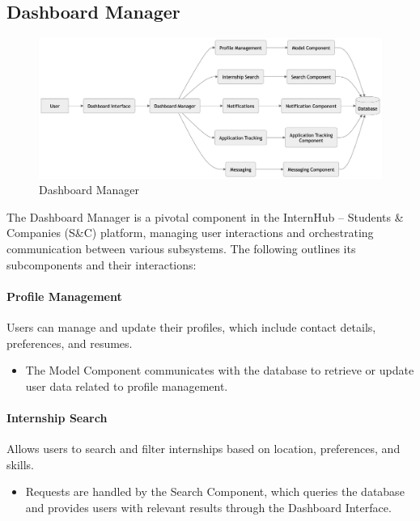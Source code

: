 \subsection{Dashboard Manager}
\label{subsubsec:dashboard_manager}

\begin{figure}[H]
    \begin{center}
        \includegraphics[width=0.82\linewidth]{JhaBhatiaSharma/imagesDD/DashboardManager.png}
        \caption{Dashboard Manager}
        \label{fig:dashboardmanager}%
    \end{center}
\end{figure}

The Dashboard Manager is a pivotal component in the InternHub – Students \& Companies (S\&C) platform, managing user interactions and orchestrating communication between various subsystems. The following outlines its subcomponents and their interactions:

\paragraph{Profile Management}
Users can manage and update their profiles, which include contact details, preferences, and resumes.
\begin{itemize}
    \item The Model Component communicates with the database to retrieve or update user data related to profile management.
\end{itemize}

\paragraph{Internship Search}
Allows users to search and filter internships based on location, preferences, and skills.
\begin{itemize}
    \item Requests are handled by the Search Component, which queries the database and provides users with relevant results through the Dashboard Interface.
\end{itemize}

